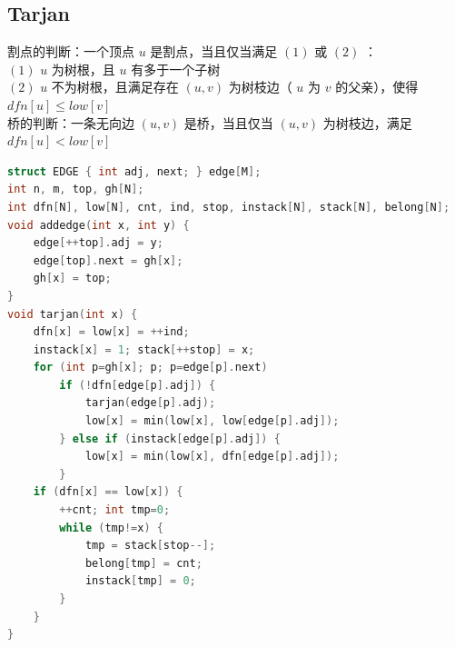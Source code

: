 \documentclass{article}
\begin{document}
\begin{CJK}{UTF8}{song}
\subsection{Tarjan}
割点的判断：一个顶点 $u$ 是割点，当且仅当满足 $(1)$ 或 $(2)$ ： \\
$(1)$ $u$ 为树根，且 $u$ 有多于一个子树 \\
$(2)$ $u$ 不为树根，且满足存在 $(u, v)$ 为树枝边（ $u$ 为 $v$ 的父亲），使得 $dfn[u] \leq low[v]$ \\
桥的判断：一条无向边 $(u, v)$ 是桥，当且仅当 $(u, v)$ 为树枝边，满足 $dfn[u] < low[v]$ 
\begin{lstlisting}[language=C++]
struct EDGE { int adj, next; } edge[M];
int n, m, top, gh[N];
int dfn[N], low[N], cnt, ind, stop, instack[N], stack[N], belong[N];
void addedge(int x, int y) {
	edge[++top].adj = y;
	edge[top].next = gh[x];
	gh[x] = top;
}
void tarjan(int x) {
	dfn[x] = low[x] = ++ind;
	instack[x] = 1; stack[++stop] = x;
	for (int p=gh[x]; p; p=edge[p].next)
		if (!dfn[edge[p].adj]) {
			tarjan(edge[p].adj);
			low[x] = min(low[x], low[edge[p].adj]);
		} else if (instack[edge[p].adj]) {
			low[x] = min(low[x], dfn[edge[p].adj]);
		}
	if (dfn[x] == low[x]) {
		++cnt; int tmp=0;
		while (tmp!=x) {
			tmp = stack[stop--];
			belong[tmp] = cnt;
			instack[tmp] = 0;
		}
	}
}
\end{lstlisting}

\end{CJK}
\end{document}
